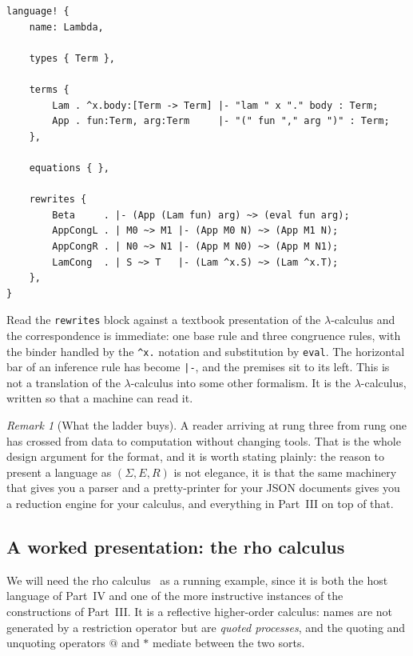 \documentclass[11pt]{article}
\theoremstyle{definition}
\theoremstyle{plain}
\theoremstyle{remark}
\newtheorem{remark}[definition]{Remark}
\begin{document}
\begin{lstlisting}
language! {
    name: Lambda,

    types { Term },

    terms {
        Lam . ^x.body:[Term -> Term] |- "lam " x "." body : Term;
        App . fun:Term, arg:Term     |- "(" fun "," arg ")" : Term;
    },

    equations { },

    rewrites {
        Beta     . |- (App (Lam fun) arg) ~> (eval fun arg);
        AppCongL . | M0 ~> M1 |- (App M0 N) ~> (App M1 N);
        AppCongR . | N0 ~> N1 |- (App M N0) ~> (App M N1);
        LamCong  . | S ~> T   |- (Lam ^x.S) ~> (Lam ^x.T);
    },
}
\end{lstlisting}

Read the \texttt{rewrites} block against a textbook presentation of the
$\lambda$-calculus and the correspondence is immediate: one base rule and three
congruence rules, with the binder handled by the \texttt{\^{}x.} notation and
substitution by \texttt{eval}. The horizontal bar of an inference rule has become
\texttt{|-}, and the premises sit to its left. This is not a translation of the
$\lambda$-calculus into some other formalism. It is the $\lambda$-calculus, written so
that a machine can read it.

\begin{remark}[What the ladder buys]
A reader arriving at rung three from rung one has crossed from data to computation
without changing tools. That is the whole design argument for the format, and it is
worth stating plainly: the reason to present a language as $(\Sigma, E, R)$ is not
elegance, it is that the same machinery that gives you a parser and a pretty-printer
for your JSON documents gives you a reduction engine for your calculus, and everything
in Part~III on top of that.
\end{remark}

\subsection{A worked presentation: the rho calculus}
\label{subsec:rho-presentation}

We will need the rho calculus~\cite{MeredithRadestock2005} as a running example, since
it is both the host language of Part~IV and one of the more instructive instances of
the constructions of Part~III. It is a reflective higher-order calculus: names are not
generated by a restriction operator but are \emph{quoted processes}, and the quoting and
unquoting operators $@$ and $*$ mediate between the two sorts.
\end{document}
